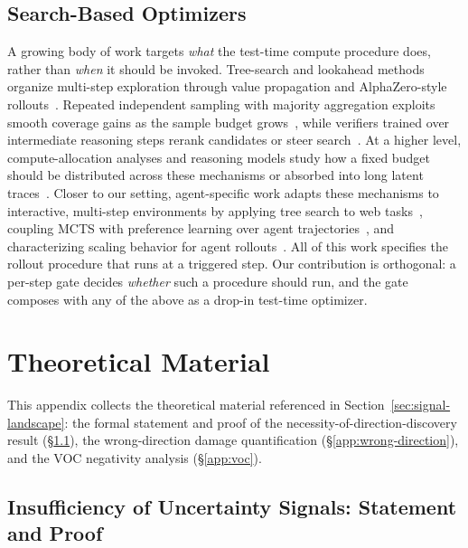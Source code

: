 \subsection{Search-Based Optimizers}

A growing body of work targets \emph{what} the test-time compute
procedure does, rather than \emph{when} it should be invoked.
Tree-search and lookahead methods organize multi-step
exploration through value propagation and AlphaZero-style
rollouts~\cite{yao2023tree,zhou2024lats,hao2023reasoning,wang2026flare,feng2024alphazero,inoue2025abmcts}.
Repeated independent sampling with majority aggregation
exploits smooth coverage gains as the sample budget
grows~\cite{wang2023selfconsistency,brown2024monkeys}, while
verifiers trained over intermediate reasoning steps rerank
candidates or steer
search~\cite{lightman2024lets,wang2024mathshepherd}. At a
higher level, compute-allocation analyses and reasoning models
study how a fixed budget should be distributed across these
mechanisms or absorbed into long latent
traces~\cite{snell2024scaling,deepseek2025r1}.
Closer to our setting, agent-specific work adapts these
mechanisms to interactive, multi-step environments by applying
tree search to web tasks~\cite{koh2024tree}, coupling MCTS with
preference learning over agent
trajectories~\cite{putta2024agentq}, and characterizing scaling
behavior for agent
rollouts~\cite{DBLP:journals/corr/abs-2506-12928,huang2026evolverouter}.
All of this work specifies the rollout procedure that runs at a
triggered step. Our contribution is orthogonal: a per-step gate
decides \emph{whether} such a procedure should run, and the gate
composes with any of the above as a drop-in test-time optimizer.


\section{Theoretical Material}
\label{app:theory}

This appendix collects the theoretical material referenced in
Section~\ref{sec:signal-landscape}: the formal statement and proof
of the necessity-of-direction-discovery result
(\S\ref{app:proof-necessity}), the wrong-direction damage
quantification (\S\ref{app:wrong-direction}), and the VOC
negativity analysis (\S\ref{app:voc}).

\subsection{Insufficiency of Uncertainty Signals: Statement and Proof}
\label{app:proof-necessity}

